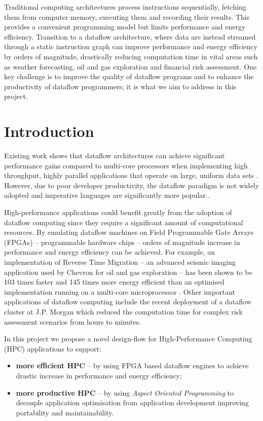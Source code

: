 Traditional computing architectures process instructions sequentially,
fetching them from computer memory, executing them and recording their
results. This provides a convenient programming model but limits
performance and energy efficiency. Transition to a dataflow
architecture, where data are instead streamed through a static
instruction graph can improve performance and energy efficiency by
orders of magnitude, drastically reducing computation time in vital
areas such as weather forecasting, oil and gas exploration and
financial risk assessment. One key challenge is to improve the quality
of dataflow programs and to enhance the productivity of dataflow
programmers; it is what we aim to address in this project.

\section{Introduction}

Existing work shows that dataflow architectures can achieve
significant performance gains compared to multi-core processors when
implementing high throughput, highly parallel applications that
operate on large, uniform data sets \cite{Flynn:Pell:Mencer:2012,
  Mencer:2012}.  However, due to poor developer productivity, the
dataflow paradigm is not widely adopted and imperative languages are
significantly more popular \cite{Tiobe:2012}.

High-performance applications could benefit greatly from the adoption
of dataflow computing since they require a significant amount of
computational resources. By emulating dataflow machines on Field
Programmable Gate Arrays (FPGAs) -- programmable hardware chips --
orders of magnitude increase in performance and energy efficiency can
be achieved.  For example, an implementation of Reverse Time Migration
-- an advanced seismic imaging application used by Chevron for oil and
gas exploration -- has been shown to be 103 times faster and 145 times
more energy efficient than an optimised implementation running on a
multi-core microprocessor
\cite{Xinyu:Qiwei:Luk:Qiang:Pell:2012}. Other important applications
of dataflow computing include the recent deployment of a dataflow
cluster at J.P. Morgan which reduced the computation time for complex
risk assessment scenarios from hours to minutes.

In this project we propose a novel design-flow for High-Performance
Computing (HPC) applications to support:
\begin{itemize}
\item \textbf{more efficient HPC} -- by using FPGA based dataflow
  engines to achieve drastic increase in performance and energy
  efficiency;
\item \textbf{more productive HPC} -- by using \emph{Aspect Oriented
    Programming} to decouple application optimisation from application
  development improving portability and maintainability.
\end{itemize}


